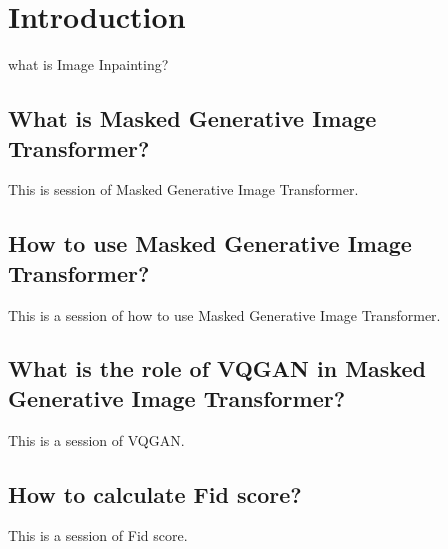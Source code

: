 \section{Introduction}
what is Image Inpainting?

\subsection{What is Masked Generative Image Transformer?}
This is session of Masked Generative Image Transformer.

\subsection{How to use Masked Generative Image Transformer?}
This is a session of how to use Masked Generative Image Transformer.

\subsection{What is the role of VQGAN in Masked Generative Image Transformer?}
This is a session of VQGAN.

\subsection{How to calculate Fid score?}
This is a session of Fid score. 



